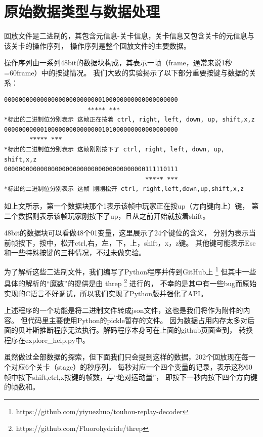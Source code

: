 \documentclass[UTF8]{ctexart}
\begin{document}
\section{原始数据类型与数据处理}

回放文件是二进制的，其包含元信息-关卡信息，关卡信息又包含关卡的元信息与该关卡的操作序列，
操作序列是整个回放文件的主要数据。

操作序列由一系列48bit的数据块构成，其表示一帧（frame，通常来说1秒=60frame）中的按键情况。
我们大致的实验揭示了以下部分重要按键与数据的关系：

\begin{verbatim}
000000000000000000000000000100000000000000000000
                       ***** ***                 
*标出的二进制位分别表示 这帧正在按着 ctrl, right, left, down, up, shift,x,z
000000000001000000000000000101000000000000000000
       ***** ***                                
*标出的二进制位分别表示 这帧刚刚按下了 ctrl, right, left, down, up, shift,x,z
000000000000000000000000000000000000000111110111
                                       ***** ***
*标出的二进制位分别表示 这帧 刚刚松开 ctrl, right,left,down,up,shift,x,z
\end{verbatim}
                                       
如上文所示，第一个数据块那个1表示该帧中玩家正在按up（方向键向上）键，
第二个数据则表示该帧玩家刚按下了up，且从之前开始就按着shift。

48bit的数据块可以看做48个01变量，这里展示了24个键位的含义，
分别为表示当前帧按下，按中，松开ctrl,右，左，下，上，shift，x，z键。
其他键可能表示Esc和一些特殊按键的三种情况，不过未做实验。

为了解析这些二进制文件，我们编写了Python程序并传到GitHub上 
\footnote{ https://github.com/yiyuezhuo/touhou-replay-decoder }
但其中一些具体的解析的“魔数”的提供是由  threp \footnote{ https://github.com/Fluorohydride/threp } 进行的，
不幸的是其中有一些bug而原始实现的C语言不好调试，所以我们实现了Python版并强化了API。

上述程序的一个功能是将二进制文件转成json文件，这也是我们将作为附件的内容。
但代码里主要使用Python的pickle暂存的文件。
因为数据占用内存太多对后面的贝叶斯推断程序无法执行。解码程序本身可在上面的github页面查到，
转换程序在explore\_help.py中。

虽然做过全部数据的探索，但下面我们只会提到这样的数据，202个回放现在每一个对应6个关卡（stage）的秒序列，
每秒对应一个四个变量的记录，表示这秒60帧中按下shift,ctrl,x按键的帧数，与“绝对运动量”，
即按下一秒内按下四个方向键的帧数和。
\end{document}
